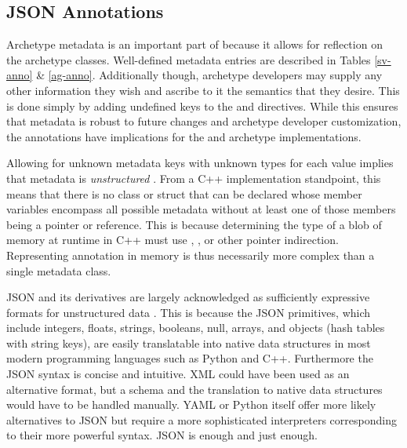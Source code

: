 \subsection{JSON Annotations}

Archetype metadata is an important part of \cyclus because it allows for 
reflection on the archetype classes. Well-defined metadata entries are 
described in Tables \ref{sv-anno} \& \ref{ag-anno}. 
Additionally though, archetype developers may supply 
any other information they wish and ascribe to it the semantics that they desire.
This is done simply by adding undefined keys to the  and
 \cycpp directives.
While this ensures that metadata is robust to future changes and archetype developer
customization, the annotations have implications for the \cyclus and archetype 
implementations.

Allowing for unknown metadata keys with unknown types for each value implies that 
metadata is \emph{unstructured} \cite{feldman2007text}. From a C++ implementation 
standpoint, this means that there is no class or struct that can be declared whose
member variables encompass all possible metadata without at least one of those
members being a pointer or reference. This is because determining the type 
of a blob of memory at runtime in C++ must use , , 
or other pointer indirection. Representing annotation in memory is thus 
necessarily more complex than a single metadata class.

\acrlong{JSON} and its derivatives are largely acknowledged as sufficiently expressive 
formats for unstructured data \cite{moniruzzaman2013nosql}. This is because the
\gls{JSON} primitives, which include integers, floats, strings, booleans, null, arrays, 
and objects (hash tables with string keys), are easily translatable into native
data structures in most modern programming languages such as Python and C++. 
Furthermore the \gls{JSON} syntax is concise and intuitive. \gls{XML} could have been used 
as an alternative format, but a schema and the translation to native data structures 
would have to be handled manually. \gls{YAML} \cite{ben2009yaml} or Python itself offer 
more likely  alternatives to \gls{JSON} but require a more sophisticated interpreters 
corresponding to their more powerful syntax. \gls{JSON} is enough and just enough.


